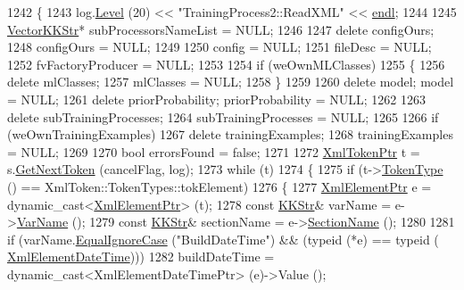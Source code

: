 \begin{DoxyCode}
1242 \{
1243   log.\hyperlink{class_k_k_b_1_1_run_log_a32cf761d7f2e747465fd80533fdbb659}{Level} (20) << \textcolor{stringliteral}{"TrainingProcess2::ReadXML"} << \hyperlink{namespace_k_k_b_ad1f50f65af6adc8fa9e6f62d007818a8}{endl};
1244 
1245   \hyperlink{class_k_k_b_1_1_vector_k_k_str}{VectorKKStr}*  subProcessorsNameList = NULL;
1246 
1247   \textcolor{keyword}{delete}  configOurs;
1248   configOurs = NULL;
1249   
1250   config = NULL;
1251   fileDesc = NULL;
1252   fvFactoryProducer = NULL;
1253 
1254   \textcolor{keywordflow}{if}  (weOwnMLClasses)
1255   \{
1256     \textcolor{keyword}{delete}  mlClasses;
1257     mlClasses = NULL;
1258   \}
1259 
1260   \textcolor{keyword}{delete}  model;             model            = NULL;
1261   \textcolor{keyword}{delete}  priorProbability;  priorProbability = NULL;
1262 
1263   \textcolor{keyword}{delete}  subTrainingProcesses;
1264   subTrainingProcesses = NULL;
1265 
1266   \textcolor{keywordflow}{if}  (weOwnTrainingExamples)
1267     \textcolor{keyword}{delete}  trainingExamples;
1268   trainingExamples = NULL;
1269 
1270   \textcolor{keywordtype}{bool}  errorsFound = \textcolor{keyword}{false};
1271 
1272   \hyperlink{class_k_k_b_1_1_xml_token}{XmlTokenPtr}  t = s.\hyperlink{class_k_k_b_1_1_xml_stream_a87cc738b05c666cf5d5c25beaab477b4}{GetNextToken} (cancelFlag, log);
1273   \textcolor{keywordflow}{while}  (t)
1274   \{
1275     \textcolor{keywordflow}{if}  (t->\hyperlink{class_k_k_b_1_1_xml_token_ae98e2c1a798882647578cae4adcd7176}{TokenType} () == XmlToken::TokenTypes::tokElement)
1276     \{
1277       \hyperlink{class_k_k_b_1_1_xml_element}{XmlElementPtr}  e = \textcolor{keyword}{dynamic\_cast<}\hyperlink{class_k_k_b_1_1_xml_element}{XmlElementPtr}\textcolor{keyword}{>} (t);
1278       \textcolor{keyword}{const} \hyperlink{class_k_k_b_1_1_k_k_str}{KKStr}&  varName = e->\hyperlink{class_k_k_b_1_1_xml_element_aef57cf00be66a3a387ce849b35125f51}{VarName} ();
1279       \textcolor{keyword}{const} \hyperlink{class_k_k_b_1_1_k_k_str}{KKStr}&  sectionName = e->\hyperlink{class_k_k_b_1_1_xml_element_a2b85dcb37a0f63bd7979d16d12296876}{SectionName} ();
1280 
1281       \textcolor{keywordflow}{if}  (varName.\hyperlink{class_k_k_b_1_1_k_k_str_a562f9696417c53f66bc4088eac072ab5}{EqualIgnoreCase} (\textcolor{stringliteral}{"BuildDateTime"})  &&  (\textcolor{keyword}{typeid} (*e) == \textcolor{keyword}{typeid} (
      \hyperlink{class_k_k_b_1_1_xml_element_date_time}{XmlElementDateTime})))
1282         buildDateTime = dynamic\_cast<XmlElementDateTimePtr> (e)->Value ();

\end{DoxyCode}
